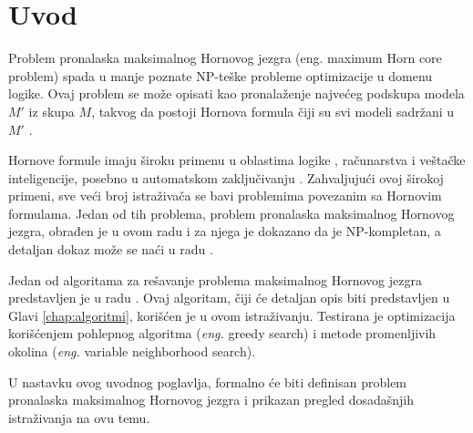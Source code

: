 \documentclass[12pt,oneside]{memoir}
\begin{document}
\frontmatter
\naslovna
\komisija
\apstrakt
\tableofcontents*

\mainmatter

\chapter{Uvod}
\label{chp:uvod}
Problem pronalaska maksimalnog Hornovog jezgra (eng. maximum Horn core problem) spada u manje poznate NP-teške probleme optimizacije u domenu logike. Ovaj problem se može opisati kao pronalaženje najvećeg podskupa modela \(M'\) iz skupa \(M\), takvog da postoji Hornova formula čiji su svi modeli sadržani u \(M'\) \cite{HCproblem}.

Hornove formule imaju široku primenu u oblastima logike \cite{doc43,doc2}, računarstva i veštačke inteligencije, posebno u automatskom zaključivanju \cite{doc41,doc42}. Zahvaljujući ovoj širokoj primeni, sve veći broj istraživača se bavi problemima povezanim sa Hornovim formulama. Jedan od tih problema, problem pronalaska maksimalnog Hornovog jezgra, obrađen je u ovom radu i za njega je dokazano da je NP-kompletan, a detaljan dokaz može se naći u radu \cite{doc3}.



Jedan od algoritama za rešavanje problema maksimalnog Hornovog jezgra predstavljen je u radu \cite{doc1}. Ovaj algoritam, čiji će detaljan opis biti predstavljen u Glavi \ref{chap:algoritmi}, korišćen je u ovom istraživanju. Testirana je optimizacija korišćenjem pohlepnog algoritma (\textit{eng.} greedy search) i metode promenljivih okolina (\textit{eng.} variable neighborhood search).

U nastavku ovog uvodnog poglavlja, formalno će biti definisan problem pronalaska maksimalnog Hornovog jezgra i prikazan pregled dosadašnjih istraživanja na ovu temu.
\end{document}
